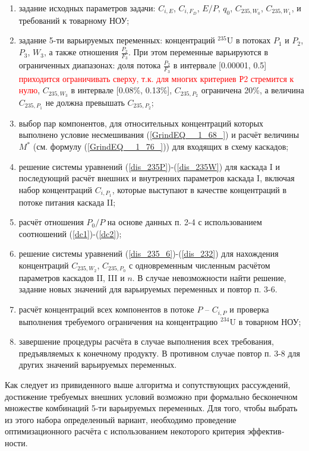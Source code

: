 {\begin{enumerate}
    \item задание исходных параметров задачи: $C_{i,E}$, $C_{i,F_D}$, $E/P$, $q_0$, $C_{235,{W_0}}$, $C_{235,{W_1}}$, и требований к товарному НОУ;
    \item задание 5-ти варьируемых переменных: концентраций $^{235}$U в потоках $P_1$ и $P_2$, $P_3$, $W_3$, а также отношения $\frac{P_{2}}{F_3}$. При этом переменные варьируются в ограниченных диапазонах: доля потока $\frac{P_{2}}{F_3}$ в интервале [0.00001, 0.5] 
    \textcolor{red}{приходится ограничивать сверху, т.к. для многих критериев Р2 стремится к нулю}, $C_{235,{W_3}}$ в интервале [0.08\%, 0.13\%], $C_{235,{P_2}}$ ограничена 20\%, а величина $C_{235,{P_1}}$ не должна превышать $C_{235,{P_2}}$;
    \item выбор пар компонентов, для относительных концентраций которых выполнено условие несмешивания (\ref{GrindEQ__1_68_}) и расчёт величины $M^{*}$ (см. формулу (\ref{GrindEQ__1_76_})) для входящих в схему каскадов;
    \item решение системы уравнений (\ref{dis_235P})-(\ref{dis_235W}) для каскада I и последующий расчёт внешних и внутренних параметров каскада I, включая набор концентраций $C_{i,{P_1}}$, которые выступают в качестве концентраций в потоке питания каскада II;
    \item расчёт отношения ${P_0}/P$ на основе данных п. 2-4 с использованием соотношений (\ref{dc1})-(\ref{dc2});
    \item решение системы уравнений (\ref{dis_235_6})-(\ref{dis_232}) для нахождения концентраций $C_{235,{W_2}}$, $C_{235,{P_0}}$ с одновременным численным расчётом параметров каскадов II, III и $n$. В случае невозможности найти решение, задание новых значений для варьируемых переменных и повтор п. 3-6. 
    \item расчёт концентраций всех компонентов в потоке $P$ -- $C_{i, P}$ и проверка выполнения требуемого ограничения на концентрацию $^{234}$U в товарном НОУ;
    \item завершение процедуры расчёта в случае выполнения всех требования, предъявляемых к конечному продукту. В противном случае повтор п. 3-8 для других значений варьируемых переменных.
\end{enumerate}

Как следует из привиденного выше алгоритма и сопутствующих рас­суждений, достижение требуемых внешних условий возможно при формально бесконечном множестве комбинаций 5-ти варьируемых переменных. Для того, чтобы выбрать из этого набора определенный вариант, необходимо проведение оптимизационного расчёта с использованием некоторого критерия эффектив­ности.

}
